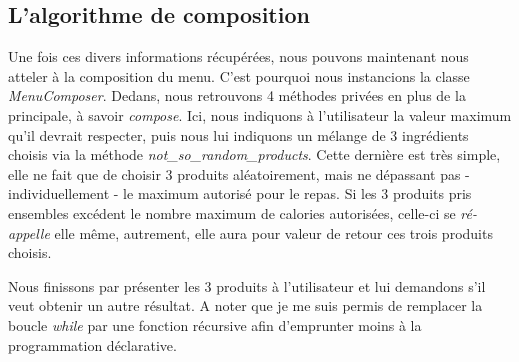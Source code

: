 \subsection{L'algorithme de composition}
Une fois ces divers informations récupérées, nous pouvons maintenant nous atteler à la composition du menu. C'est pourquoi nous instancions la classe \textit{MenuComposer}. Dedans, nous retrouvons 4 méthodes privées en plus de la principale, à savoir \textit{compose}. Ici, nous indiquons à l'utilisateur la valeur maximum qu'il devrait respecter, puis nous lui indiquons un mélange de 3 ingrédients choisis via la méthode \textit{not\_so\_random\_products}. Cette dernière est très simple, elle ne fait que de choisir 3 produits aléatoirement, mais ne dépassant pas - individuellement - le maximum autorisé pour le repas. Si les 3 produits pris ensembles excédent le nombre maximum de calories autorisées, celle-ci se \textit{ré-appelle} elle même, autrement, elle aura pour valeur de retour ces trois produits choisis.

Nous finissons par présenter les 3 produits à l'utilisateur et lui demandons s'il veut obtenir un autre résultat. A noter que je me suis permis de remplacer la boucle \textit{while} par une fonction récursive afin d'emprunter moins à la programmation déclarative.